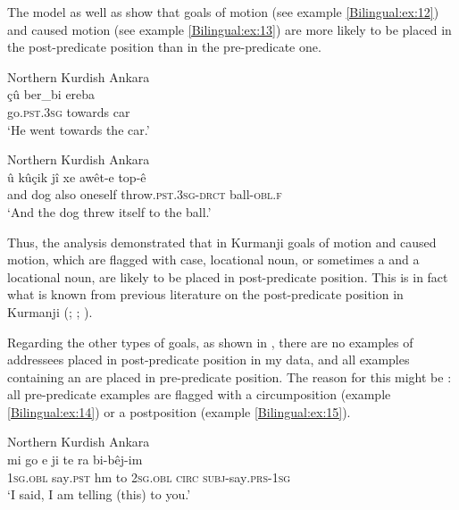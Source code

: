 \documentclass[output=paper,colorlinks,citecolor=brown]{langscibook}
\begin{document}
\largerpage
The model as well as  show that goals of motion  (see example \ref{Bilingual:ex:12}) and caused motion  (see example \ref{Bilingual:ex:13}) are more likely to be placed in the post-predicate position than in the pre-predicate one.

\ea\label{Bilingual:ex:12}
Northern Kurdish Ankara \citep[C, 69]{iefremenko2021KurdishAnkara} \\
\gll çû ber\_bi ereba \\
go\textsc{.pst.3sg} towards car \\
\glt `He went towards the car.' 
\z



\ea\label{Bilingual:ex:13}
Northern Kurdish Ankara \citep[E, 108]{iefremenko2021KurdishAnkara} \\
\gll û kûçik jî xe awêt-e top-ê \\
and dog also oneself throw\textsc{.pst.3sg-drct} ball\textsc{-obl.f} \\
\glt `And the dog threw itself to the ball.' 
\z

Thus, the analysis demonstrated that in Kurmanji goals of motion and caused motion, which are flagged with case, locational noun, or sometimes a  and a locational noun, are likely to be placed in post-predicate position. This is in fact what is known from previous literature on the post-predicate position in Kurmanji (\citealt{haig_verb-goal_2015}; \citealt{haig2018northern}; \citealt{gundogdu2019asymmetries}). 

Regarding the other types of goals, as shown in , there are no examples of addressees placed in post-predicate position in my data, and all examples containing an   are placed in pre-predicate position. The reason for this might be : all pre-predicate examples are flagged with a circumposition (example \ref{Bilingual:ex:14}) or a postposition (example \ref{Bilingual:ex:15}).



\ea\label{Bilingual:ex:14} 
Northern Kurdish Ankara \citep[F, 134]{iefremenko2021KurdishAnkara} \\
\gll mi go e ji te ra bi-bêj-im \\
\textsc{1sg.obl} say\textsc{.pst} hm to \textsc{2sg.obl} \textsc{circ} \textsc{subj}-say\textsc{.prs-1sg} \\
\glt `I said, I am telling (this) to you.' 
\z
\end{document}
